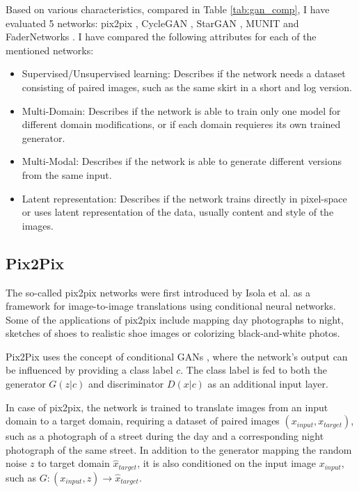 \documentclass{article}
\begin{document}
Based on various characteristics, compared in Table \ref{tab:gan_comp}, I have evaluated  5 networks: pix2pix \cite{isola_image--image_2016}, CycleGAN \cite{zhu_unpaired_2017}, StarGAN \cite{choi_stargan:_2017}, MUNIT \cite{huang_multimodal_2018} and FaderNetworks \cite{lample_fader_2017}. I have compared the following attributes for each of the mentioned networks:
\begin{itemize}
\item Supervised/Unsupervised learning: Describes if the network needs a dataset consisting of paired images, such as the same skirt in a short and log version.
\item Multi-Domain: Describes if the network is able to train only one model for different domain modifications, or if each domain requieres its own trained generator.
\item Multi-Modal: Describes if the network is able to generate different versions from the same input.
\item Latent representation: Describes if the network trains directly in pixel-space or uses latent representation of the data, usually content and style of the images.
\end{itemize}

\subsection{Pix2Pix}
The so-called pix2pix networks were first introduced by Isola et al. \cite{isola_image--image_2016} as a framework for image-to-image translations using conditional neural networks. Some of the applications of pix2pix include mapping day photographs to night, sketches of shoes to realistic shoe images or colorizing black-and-white photos.

Pix2Pix uses the concept of conditional GANs \cite{mirza_conditional_2014}, where the network's output can be influenced by providing a class label $c$. The class label is fed to both the generator $G(z|c)$ and discriminator $D(x|c)$ as an additional input layer.

In case of pix2pix, the network is trained to translate images from an input domain to a target domain, requiring a dataset of paired images $(x_{input}, x_{target})$, such as a photograph of a street during the day and a corresponding night photograph of the same street. In addition to the generator mapping the random noise $z$ to target domain $\hat{x}_{target}$, it is also conditioned on the input image $x_{input}$, such as $G: (x_{input}, z) \rightarrow \hat{x}_{target}$.
\end{document}
